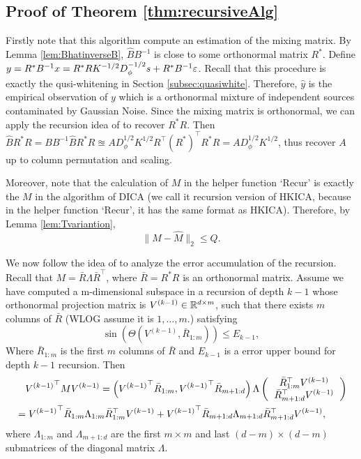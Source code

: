 \subsection{Proof of Theorem \ref{thm:recursiveAlg}}
Firstly note that this algorithm compute an estimation of the mixing matrix. 
By Lemma \ref{lem:BhatinverseB}, $\hat{B}B^{-1}$ is close to some orthonormal matrix $R^*$.
Define $y = R^*B^{-1}x = R^*R K^{-1/2}D_{\phi}^{-1/2}s + R^*B^{-1}\varepsilon$. Recall that this procedure  is exactly the qusi-whitening in Section \ref{subsec:quasiwhite}. Therefore, 
$\hat{y}$ is the empirical observation of $y$ which is a orthonormal mixture of independent sources contaminated by Gaussian Noise. 
Since the mixing matrix is orthonormal, we can apply the recursion idea of \citet{vempala2014max} to recover $R^*R$. 
Then $\hat{B}R^*R= BB^{-1}\hat{B}R^*R \approxeq AD_{\phi}^{1/2}K^{1/2}R^{\top} (R^*)^{\top}R^*R = AD_{\phi}^{1/2}K^{1/2}$, thus recover $A$ up to column permutation and scaling. 

Moreover, note that the calculation of $M$ in the helper function `Recur' is exactly the $M$ in the algorithm of DICA (we call it recursion version of HKICA, because in the helper function `Recur', it has the same format as HKICA).
Therefore, by Lemma \ref{lem:Tvariantion},
\[
\|M-\hat{M}\|_2 \le Q.
\]

We now follow the idea of \citet{vempala2014max} to analyze the error accumulation of the recursion.
Recall that $M = \bar{R}\Lambda\bar{R}^{\top}$, where $\bar{R} = R^*R$ is an orthonormal matrix.
Assume we have computed a m-dimensional subspace in a recursion of depth $k-1$ whose orthonormal projection matrix is $V^{(k-1)} \in \mathbb{R}^{d\times m}$, such that there exists $m$ columns of $\bar{R}$ (WLOG assume it is $1,\ldots,m$.) satisfying
\[
\sin\left(\Theta\left(V^{(k-1)}, \bar{R}_{1:m}\right)\right) \le E_{k-1},
\] 
Where $\bar{R}_{1:m}$ is the first $m$ columns of $\bar{R}$ and $E_{k-1}$ is a error upper bound for depth $k-1$ recursion.
Then
\begin{align*}
& \quad {V^{(k-1)}}^\top MV^{(k-1)} = \left( {V^{(k-1)}}^\top\bar{R}_{1:m}, {V^{(k-1)}}^\top\bar{R}_{m+1:d}\right)\Lambda
\left(
\begin{tabular}{c}
$\bar{R}_{1:m}^{\top} V^{(k-1)}$ \\
$\bar{R}_{m+1:d}^{\top} V^{(k-1)}$
\end{tabular}
\right) \\
& = {V^{(k-1)}}^\top\bar{R}_{1:m}\Lambda_{1:m} \bar{R}_{1:m}^{\top} V^{(k-1)} + {V^{(k-1)}}^\top\bar{R}_{m+1:d}\Lambda_{m+1:d}\bar{R}_{m+1:d}^{\top} V^{(k-1)},
\end{align*}
where $\Lambda_{1:m}$ and $\Lambda_{m+1:d}$ are the first $m\times m$  and last $(d-m)\times (d-m)$ submatrices of the diagonal matrix $\Lambda$.

